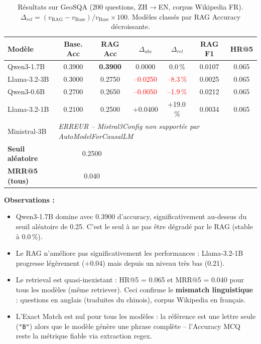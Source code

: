 \documentclass[12pt,a4paper]{article}
\begin{document}
\begin{table}[H]
\centering
\caption{R\'esultats sur GeoSQA (200 questions, ZH$\rightarrow$EN, corpus Wikipedia FR).
  $\Delta_{rel} = (v_{\text{RAG}} - v_{\text{Base}}) / v_{\text{Base}} \times 100$.
  Mod\`eles class\'es par RAG Accuracy d\'ecroissante.}
\label{tab:geosqa_results}
\begin{tabular}{@{} l c c c c c c @{}}
\toprule
\textbf{Mod\`ele} & \textbf{Base. Acc} & \textbf{RAG Acc}
  & \textbf{$\Delta_{abs}$} & \textbf{$\Delta_{rel}$}
  & \textbf{RAG F1} & \textbf{HR@5} \\
\midrule
Qwen3-1.7B
  & 0.3900 & \textbf{0.3900}
  & \phantom{+}0.0000 & \phantom{+}0.0\,\%
  & 0.0107 & 0.065 \\
\rowcolor{lightgray}
Llama-3.2-3B
  & 0.3000 & 0.2750
  & \textcolor{red}{--0.0250} & \textcolor{red}{--8.3\,\%}
  & 0.0025 & 0.065 \\
Qwen3-0.6B
  & 0.2700 & 0.2650
  & \textcolor{red}{--0.0050} & \textcolor{red}{--1.9\,\%}
  & 0.0212 & 0.065 \\
\rowcolor{lightgray}
Llama-3.2-1B
  & 0.2100 & 0.2500
  & \textcolor{green!60!black}{+0.0400} & \textcolor{green!60!black}{+19.0\,\%}
  & 0.0034 & 0.065 \\
\midrule
Ministral-3B
  & \multicolumn{6}{l}{\textit{ERREUR -- Mistral3Config non support\'ee par AutoModelForCausalLM}} \\
\midrule
\textbf{Seuil al\'eatoire} & \multicolumn{2}{c}{0.2500} & & & & \\
\textbf{MRR@5 (tous)} & \multicolumn{2}{c}{0.040} & & & & \\
\bottomrule
\end{tabular}
\end{table}

\textbf{Observations :}
\begin{itemize}[leftmargin=*]
  \item Qwen3-1.7B domine avec 0.3900 d'accuracy, significativement au-dessus du seuil
  al\'eatoire de 0.25. C'est le seul \`a ne pas \^etre d\'egrad\'e par le RAG (stable \`a 0.0\,\%).
  \item Le RAG n'am\'eliore pas significativement les performances : Llama-3.2-1B progresse
  l\'eg\`erement ($+$0.04) mais depuis un niveau tr\`es bas (0.21).
  \item Le retrieval est quasi-inexistant : HR@5 = 0.065 et MRR@5 = 0.040 pour tous les
  mod\`eles (m\^eme retriever). Ceci confirme le \textbf{mismatch linguistique} : questions
  en anglais (traduites du chinois), corpus Wikipedia en fran\c{c}ais.
  \item L'Exact Match est nul pour tous les mod\`eles : la r\'ef\'erence est une lettre seule
  (\texttt{"B"}) alors que le mod\`ele g\'en\`ere une phrase compl\`ete -- l'Accuracy MCQ
  reste la m\'etrique fiable via extraction regex.
\end{itemize}
\end{document}
